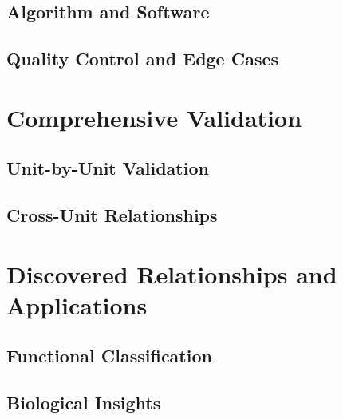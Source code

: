 \documentclass[12pt,oneside,a4paper]{book}
\begin{document}
\chapter{Algorithm and Software}


\chapter{Quality Control and Edge Cases}



\part{Comprehensive Validation}

\chapter{Unit-by-Unit Validation}


\chapter{Cross-Unit Relationships}



\part{Discovered Relationships and Applications}

\chapter{Functional Classification}


\chapter{Biological Insights}

\end{document}
